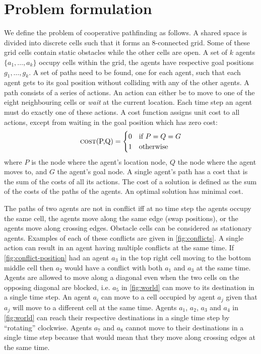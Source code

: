 \section{Problem formulation}\label{sec:problem}

We define the problem of cooperative pathfinding as follows. A shared
space is divided into discrete cells such that it forms an 8-connected grid.
Some of these grid cells contain static obstacles while the other cells are
open. A set of $k$ agents $\{a_1, \ldots, a_k\}$ occupy cells within the grid,
the agents have respective goal positions $g_1, \ldots, g_k$. A set of paths
need to be found, one for each agent, such that each agent gets to its goal
position without colliding with any of the other agents. A path consists of a
series of actions. An action can either be to move to one of the eight
neighbouring cells or \emph{wait} at the current location. Each time step an 
agent must do exactly one of these actions.
A cost function assigns unit cost to all actions, except from waiting in the 
goal position which has zero cost:
\[
\text{\textsc{cost}(P,Q)} =
\begin{cases}
0 & \text{if } P = Q = G \\
1 & \text{otherwise}
\end{cases}
\]
where $P$ is the node where the agent's location node, $Q$ the node where the
agent moves to, and $G$ the agent's goal node. A single agent's path has a
cost that is the sum of the costs of all its actions. The cost of a solution is
defined as the sum of the costs of the paths of the agents. An optimal solution 
has minimal cost.

The paths of two agents are not in conflict iff at no time step the agents
occupy the same cell, the agents move along the same edge (swap positions), or
the agents move along crossing edges. Obstacle cells can be considered as
stationary agents. Examples of each of these conflicts are given in
\autoref{fig:conflicts}. A single action can result in an agent having multiple
conflicts at the same time. If \autoref{fig:conflict-position} had an agent
$a_3$ in the top right cell moving to the bottom middle cell then $a_2$ would
have a conflict with both $a_1$ and $a_3$ at the same time. Agents are allowed
to move along a diagonal even when the two cells on the opposing diagonal are
blocked, i.e. $a_5$ in \autoref{fig:world} can move to its destination in a
single time step. An agent $a_i$ can move to a cell occupied by agent $a_j$
given that $a_j$ will move to a different cell at the same time. Agents $a_1$,
$a_2$, $a_3$ and $a_4$ in \autoref{fig:world} can reach their respective
destinations in a single time step by ``rotating'' clockwise. Agents $a_7$ and
$a_8$ cannot move to their destinations in a single time step because that
would mean that they move along crossing edges at the same time.

